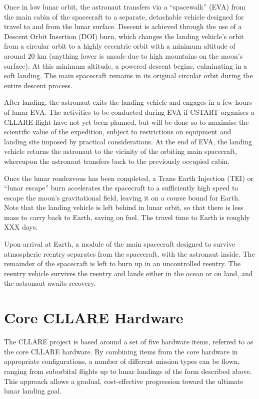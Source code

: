 \documentclass{report}
\begin{document}
Once in low lunar orbit, the astronaut transfers via a ``spacewalk'' (EVA) from the main cabin of the spacecraft to a separate, detachable vehicle designed for travel to and from the lunar surface.  Descent is achieved through the use of a Descent Orbit Insertion (DOI) burn, which changes the landing vehicle's orbit from a circular orbit to a highly eccentric orbit with a minimum altitude of around 20 km (anything lower is unsafe due to high mountains on the moon's surface).  At this minimum altitude, a powered descent begins, culminating in a soft landing.  The main spacecraft remains in its original circular orbit during the entire descent process.

After landing, the astronaut exits the landing vehicle and engages in a few hours of lunar EVA.  The activities to be conducted during EVA if CSTART organises a CLLARE flight have not yet been planned, but will be done so to maximise the scientific value of the expedition, subject to restrictions on equipment and landing site imposed by practical considerations.  At the end of EVA, the landing vehicle returns the astronaut to the vicinity of the orbiting main spacecraft, whereupon the astronaut transfers back to the previously occupied cabin.

Once the lunar rendezvous has been completed, a Trans Earth Injection (TEI) or ``lunar escape'' burn accelerates the spacecraft to a sufficiently high speed to escape the moon's gravitational field, leaving it on a course bound for Earth.  Note that the landing vehicle is left behind in lunar orbit, so that there is less mass to carry back to Earth, saving on fuel.  The travel time to Earth is roughly XXX days. 

Upon arrival at Earth, a module of the main spacecraft designed to survive atmospheric reentry separates from the spacecraft, with the astronaut inside.  The remainder of the spacecraft is left to burn up in an uncontrolled reentry.  The reentry vehicle survives the reentry and lands either in the ocean or on land, and the astronaut awaits recovery.

\section{Core CLLARE Hardware}

The CLLARE project is based around a set of five hardware items, referred to as the core CLLARE hardware.  By combining items from the core hardware in appropriate configurations, a number of different mission types can be flown, ranging from suborbital flights up to lunar landings of the form described above.  This approach allows a gradual, cost-effective progression toward the ultimate lunar landing goal.
\end{document}
